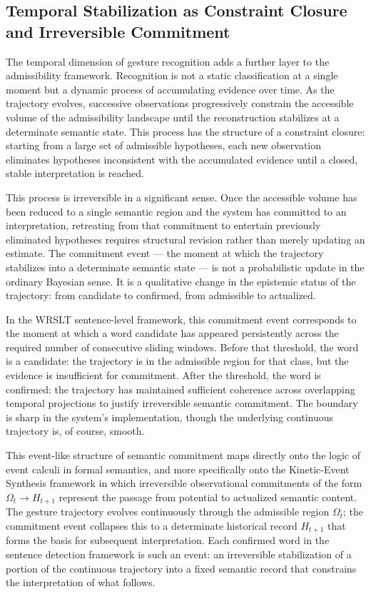 \documentclass[11pt, a4paper]{article}
\theoremstyle{definition}
\begin{document}
\subsection{Temporal Stabilization as Constraint Closure and Irreversible Commitment}

The temporal dimension of gesture recognition adds a further layer to the admissibility framework. Recognition is not a static classification at a single moment but a dynamic process of accumulating evidence over time. As the trajectory evolves, successive observations progressively constrain the accessible volume of the admissibility landscape until the reconstruction stabilizes at a determinate semantic state. This process has the structure of a constraint closure: starting from a large set of admissible hypotheses, each new observation eliminates hypotheses inconsistent with the accumulated evidence until a closed, stable interpretation is reached.

This process is irreversible in a significant sense. Once the accessible volume has been reduced to a single semantic region and the system has committed to an interpretation, retreating from that commitment to entertain previously eliminated hypotheses requires structural revision rather than merely updating an estimate. The commitment event --- the moment at which the trajectory stabilizes into a determinate semantic state --- is not a probabilistic update in the ordinary Bayesian sense. It is a qualitative change in the epistemic status of the trajectory: from candidate to confirmed, from admissible to actualized.

In the WRSLT sentence-level framework, this commitment event corresponds to the moment at which a word candidate has appeared persistently across the required number of consecutive sliding windows. Before that threshold, the word is a candidate: the trajectory is in the admissible region for that class, but the evidence is insufficient for commitment. After the threshold, the word is confirmed: the trajectory has maintained sufficient coherence across overlapping temporal projections to justify irreversible semantic commitment. The boundary is sharp in the system's implementation, though the underlying continuous trajectory is, of course, smooth.

This event-like structure of semantic commitment maps directly onto the logic of event calculi in formal semantics, and more specifically onto the Kinetic-Event Synthesis framework in which irreversible observational commitments of the form $\Omega_t \to H_{t+1}$ represent the passage from potential to actualized semantic content. The gesture trajectory evolves continuously through the admissible region $\Omega_t$; the commitment event collapses this to a determinate historical record $H_{t+1}$ that forms the basis for subsequent interpretation. Each confirmed word in the sentence detection framework is such an event: an irreversible stabilization of a portion of the continuous trajectory into a fixed semantic record that constrains the interpretation of what follows.
\end{document}
